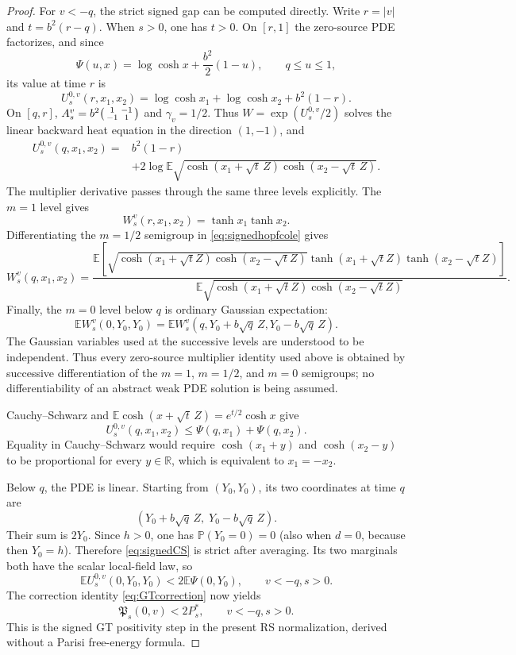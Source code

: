 \documentclass[11pt]{article}
\numberwithin{equation}{section}
\theoremstyle{plain}
\theoremstyle{definition}
\newcommand{\E}{\mathbb E}
\newcommand{\1}{\mathbf 1}
\begin{document}
\begin{proof}
For $v<-q$, the strict signed gap can be computed directly.  Write
$r=|v|$ and $t=b^2(r-q)$.  When $s>0$, one has $t>0$.  On $[r,1]$
the zero-source PDE factorizes, and since
\[
 \Psi(u,x)=\log\cosh x+\frac{b^2}{2}(1-u),
 \qquad q\le u\le1,
\]
its value at time $r$ is
\[
 U_s^{0,v}(r,x_1,x_2)
 =\log\cosh x_1+\log\cosh x_2+b^2(1-r).
\]
On $[q,r]$, $A_s^v=b^2\begin{psmallmatrix}1&-1\\-1&1\end{psmallmatrix}$
and $\gamma_v=1/2$.  Thus $W=\exp(U_s^{0,v}/2)$ solves the linear
backward heat equation in the direction $(1,-1)$, and
\begin{align}
 U_s^{0,v}(q,x_1,x_2)
 ={}&b^2(1-r)\nonumber\\
 &+2\log\E\sqrt{
   \cosh(x_1+\sqrt t\,Z)\cosh(x_2-\sqrt t\,Z)}.
 \label{eq:signedhopfcole}
\end{align}
The multiplier derivative passes through the same three levels
explicitly.  The $m=1$ level gives
\[
 W_s^v(r,x_1,x_2)=\tanh x_1\tanh x_2.
\]
Differentiating the $m=1/2$ semigroup in
\eqref{eq:signedhopfcole} gives
\[
 W_s^v(q,x_1,x_2)
 =
 \frac{\E\!\left[
 \sqrt{\cosh(x_1+\sqrt tZ)\cosh(x_2-\sqrt tZ)}
 \tanh(x_1+\sqrt tZ)\tanh(x_2-\sqrt tZ)\right]}
 {\E\sqrt{\cosh(x_1+\sqrt tZ)\cosh(x_2-\sqrt tZ)}}.
\]
Finally, the $m=0$ level below $q$ is ordinary Gaussian expectation:
\[
 \E W_s^v(0,Y_0,Y_0)
 =\E W_s^v(q,Y_0+b\sqrt q\,Z,Y_0-b\sqrt q\,Z).
\]
The Gaussian variables used at the successive levels are understood
to be independent.
Thus every zero-source multiplier identity used above is obtained by
successive differentiation of the $m=1$, $m=1/2$, and $m=0$
semigroups; no differentiability of an abstract weak PDE solution is
being assumed.

Cauchy--Schwarz and
$\E\cosh(x+\sqrt t\,Z)=e^{t/2}\cosh x$ give
\begin{equation}
 U_s^{0,v}(q,x_1,x_2)
 \le \Psi(q,x_1)+\Psi(q,x_2).
 \label{eq:signedCS}
\end{equation}
Equality in Cauchy--Schwarz would require
$\cosh(x_1+y)$ and $\cosh(x_2-y)$ to be proportional for every
$y\in\mathbb R$, which is equivalent to $x_1=-x_2$.

Below $q$, the PDE is linear.  Starting from $(Y_0,Y_0)$, its two
coordinates at time $q$ are
\[
 (Y_0+b\sqrt q\,Z,\;Y_0-b\sqrt q\,Z).
\]
Their sum is $2Y_0$.  Since $h>0$, one has
$\mathbb P(Y_0=0)=0$ (also when $d=0$, because then $Y_0=h$).
Therefore \eqref{eq:signedCS} is strict after averaging.  Its two
marginals both have the scalar local-field law, so
\begin{equation}
 \E U_s^{0,v}(0,Y_0,Y_0)<2\E\Psi(0,Y_0),
 \qquad v<-q, s>0.
 \label{eq:signedstrictPDE}
\end{equation}
The correction identity \eqref{eq:GTcorrection} now yields
\begin{equation}
 \mathfrak P_s(0,v)<2P_s^*,
 \qquad v<-q, s>0.
 \label{eq:signedpositivity}
\end{equation}
This is the signed GT positivity step in the present RS
normalization, derived without a Parisi free-energy formula.


\end{proof}
\end{document}
